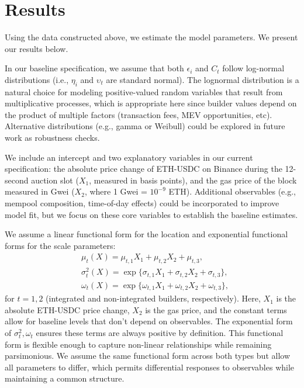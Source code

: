 \documentclass[12pt,reqno]{amsart}
\begin{document}
\section{Results} \label{sec:results}
Using the data constructed above, we estimate the model parameters. We present our results below.

In our baseline specification, we assume that both $\epsilon_i$ and $C_t$ follow log-normal distributions (i.e., $\eta_i$ and $\upsilon_t$ are standard normal). The lognormal distribution is a natural choice for modeling positive-valued random variables that result from multiplicative processes, which is appropriate here since builder values depend on the product of multiple factors (transaction fees, MEV opportunities, etc). Alternative distributions (e.g., gamma or Weibull) could be explored in future work as robustness checks.

We include an intercept and two explanatory variables in our current specification: the absolute price change of ETH-USDC on Binance during the 12-second auction slot ($X_1$, measured in basis points), and the gas price of the block measured in Gwei ($X_2$, where 1 Gwei = $10^{-9}$ ETH). Additional observables (e.g., mempool composition, time-of-day effects) could be incorporated to improve model fit, but we focus on these core variables to establish the baseline estimates. 
 
We assume a linear functional form for the location and exponential functional forms for the scale parameters:
\begin{align*}
  &\mu_t (X) = \mu_{t,1} X_1 + \mu_{t,2} X_2 + \mu_{t,3},\\
  &\sigma_t^2(X) = \exp \{\sigma_{t,1} X_1 + \sigma_{t,2} X_2 + \sigma_{t,3}\},\\
  &\omega_t(X) = \exp \{\omega_{t,1} X_1 + \omega_{t,2} X_2 + \omega_{t,3}\},
\end{align*}
for $t=1,2$ (integrated and non-integrated builders, respectively). Here, $X_1$ is the absolute ETH-USDC price change, $X_2$ is the gas price, and the constant terms allow for baseline levels that don't depend on observables. The exponential form of $\sigma_t^2,\omega_t$ ensures these terms are always positive by definition. This functional form is flexible enough to capture non-linear relationships while remaining parsimonious. We assume the same functional form across both types but allow all parameters to differ, which permits differential responses to observables while maintaining a common structure.
\end{document}
